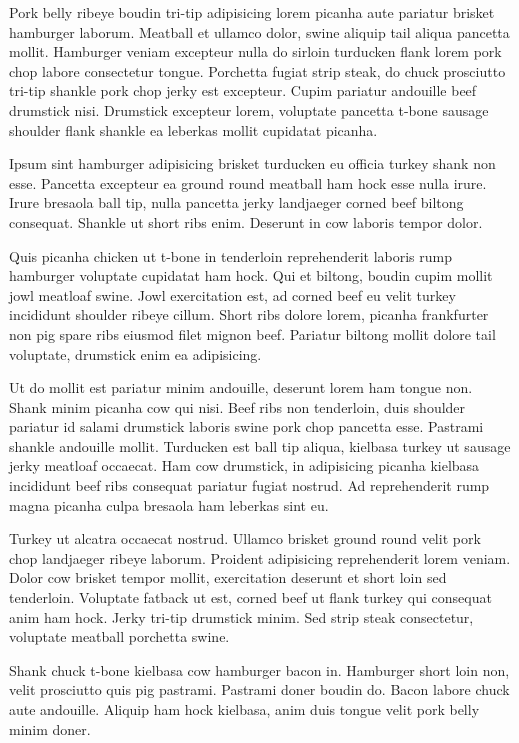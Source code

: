 Pork belly ribeye boudin tri-tip adipisicing lorem picanha aute pariatur brisket hamburger laborum. Meatball et ullamco dolor, swine aliquip tail aliqua pancetta mollit. Hamburger veniam excepteur nulla do sirloin turducken flank lorem pork chop labore consectetur tongue. Porchetta fugiat strip steak, do chuck prosciutto tri-tip shankle pork chop jerky est excepteur. Cupim pariatur andouille beef drumstick nisi. Drumstick excepteur lorem, voluptate pancetta t-bone sausage shoulder flank shankle ea leberkas mollit cupidatat picanha.

Ipsum sint hamburger adipisicing brisket turducken eu officia turkey shank non esse. Pancetta excepteur ea ground round meatball ham hock esse nulla irure. Irure bresaola ball tip, nulla pancetta jerky landjaeger corned beef biltong consequat. Shankle ut short ribs enim. Deserunt in cow laboris tempor dolor.

Quis picanha chicken ut t-bone in tenderloin reprehenderit laboris rump hamburger voluptate cupidatat ham hock. Qui et biltong, boudin cupim mollit jowl meatloaf swine. Jowl exercitation est, ad corned beef eu velit turkey incididunt shoulder ribeye cillum. Short ribs dolore lorem, picanha frankfurter non pig spare ribs eiusmod filet mignon beef. Pariatur biltong mollit dolore tail voluptate, drumstick enim ea adipisicing.

Ut do mollit est pariatur minim andouille, deserunt lorem ham tongue non. Shank minim picanha cow qui nisi. Beef ribs non tenderloin, duis shoulder pariatur id salami drumstick laboris swine pork chop pancetta esse. Pastrami shankle andouille mollit. Turducken est ball tip aliqua, kielbasa turkey ut sausage jerky meatloaf occaecat. Ham cow drumstick, in adipisicing picanha kielbasa incididunt beef ribs consequat pariatur fugiat nostrud. Ad reprehenderit rump magna picanha culpa bresaola ham leberkas sint eu.

Turkey ut alcatra occaecat nostrud. Ullamco brisket ground round velit pork chop landjaeger ribeye laborum. Proident adipisicing reprehenderit lorem veniam. Dolor cow brisket tempor mollit, exercitation deserunt et short loin sed tenderloin. Voluptate fatback ut est, corned beef ut flank turkey qui consequat anim ham hock. Jerky tri-tip drumstick minim. Sed strip steak consectetur, voluptate meatball porchetta swine.

Shank chuck t-bone kielbasa cow hamburger bacon in. Hamburger short loin non, velit prosciutto quis pig pastrami. Pastrami doner boudin do. Bacon labore chuck aute andouille. Aliquip ham hock kielbasa, anim duis tongue velit pork belly minim doner.

